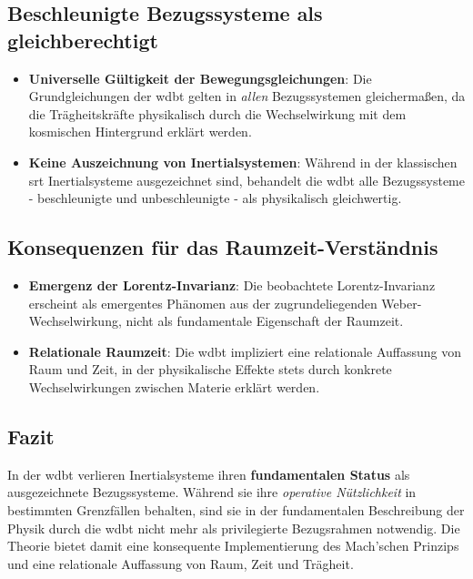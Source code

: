 \subsection{Beschleunigte Bezugssysteme als gleichberechtigt}

\begin{itemize}
    \item \textbf{Universelle Gültigkeit der Bewegungsgleichungen}: Die Grundgleichungen der \gls{wdbt} gelten in \emph{allen} Bezugssystemen gleichermaßen, da die Trägheitskräfte physikalisch durch die Wechselwirkung mit dem kosmischen Hintergrund erklärt werden.
    \item \textbf{Keine Auszeichnung von Inertialsystemen}: Während in der klassischen \gls{srt} Inertialsysteme ausgezeichnet sind, behandelt die \gls{wdbt} alle Bezugssysteme - beschleunigte und unbeschleunigte - als physikalisch gleichwertig.
\end{itemize}

\subsection{Konsequenzen für das Raumzeit-Verständnis}

\begin{itemize}
    \item \textbf{Emergenz der Lorentz-Invarianz}: Die beobachtete Lorentz-Invarianz erscheint als emergentes Phänomen aus der zugrundeliegenden Weber-Wechselwirkung, nicht als fundamentale Eigenschaft der Raumzeit.
    \item \textbf{Relationale Raumzeit}: Die \gls{wdbt} impliziert eine relationale Auffassung von Raum und Zeit, in der physikalische Effekte stets durch konkrete Wechselwirkungen zwischen Materie erklärt werden.
\end{itemize}

\subsection{Fazit}

In der \gls{wdbt} verlieren Inertialsysteme ihren \textbf{fundamentalen Status} als ausgezeichnete Bezugssysteme. Während sie ihre \emph{operative Nützlichkeit} in bestimmten Grenzfällen behalten, sind sie in der fundamentalen Beschreibung der Physik durch die \gls{wdbt} nicht mehr als privilegierte Bezugsrahmen notwendig. Die Theorie bietet damit eine konsequente Implementierung des Mach'schen Prinzips und eine relationale Auffassung von Raum, Zeit und Trägheit.

